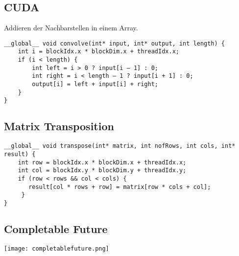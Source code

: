 \subsection{CUDA}
Addieren der Nachbarstellen in einem Array.
\begin{lstlisting}[style=csharp]
__global__ void convolve(int* input, int* output, int length) {
	int i = blockIdx.x * blockDim.x + threadIdx.x;
    if (i < length) {
		int left = i > 0 ? input[i – 1] : 0;
		int right = i < length – 1 ? input[i + 1] : 0; 
		output[i] = left + input[i] + right;
	}
}
\end{lstlisting}

\subsection{Matrix Transposition}
\begin{lstlisting}[style=csharp]
__global__ void transpose(int* matrix, int nofRows, int cols, int* result) {
	int row = blockIdx.x * blockDim.x + threadIdx.x;
	int col = blockIdx.y * blockDim.y + threadIdx.y;
	if (row < rows && col < cols) {
       result[col * rows + row] = matrix[row * cols + col];
     }
}
\end{lstlisting}

\subsection{Completable Future}
\centering
\texttt{[image: completablefuture.png]}
